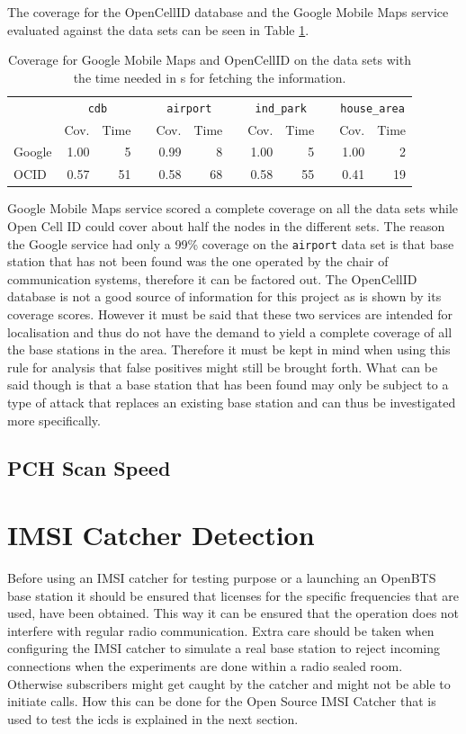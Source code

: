 The coverage for the OpenCellID database and the Google Mobile Maps service evaluated against the data sets can be seen in Table \ref{tab:coverage}.
\begin{table}
\centering
\begin{tabular}{lrrcrrcrrcrr}
\toprule
& \multicolumn{2}{c}{\texttt{cdb}} &\phantom{a}& \multicolumn{2}{c}{\texttt{airport}} &\phantom{a} & \multicolumn{2}{c}{\texttt{ind\_park}}&\phantom{a} & \multicolumn{2}{c}{\texttt{house\_area}}\\
\cmidrule{2-3} \cmidrule{5-6} \cmidrule{8-9} \cmidrule{11-12}
&Cov.&Time&	&Cov.&Time&	&Cov.&Time&	&Cov.&Time\\
\midrule
Google&		1.00&5&	&0.99&8&	&1.00&5&	&1.00&2\\
OCID&		0.57&51&	&0.58&68&	&0.58&55&	&0.41&19\\
\bottomrule
\end{tabular}
\caption{Coverage for Google Mobile Maps and OpenCellID on the data sets with the time needed in s for fetching the information.}
\label{tab:coverage}
\end{table}
Google Mobile Maps service scored a complete coverage on all the data sets while Open Cell ID could cover about half the nodes in the different sets.
The reason the Google service had only a 99\% coverage on the \texttt{airport} data set is that base station that has not been found was the one operated by the chair of communication systems, therefore it can be factored out.
The OpenCellID database is not a good source of information for this project as is shown by its coverage scores.
However it must be said that these two services are intended for localisation and thus do not have the demand to yield a complete coverage of all the base stations in the area.
Therefore it must be kept in mind when using this rule for analysis that false positives might still be brought forth.
What can be said though is that a base station that has been found may only be subject to a type of attack that replaces an existing base station and can thus be investigated more specifically.

\subsection{PCH Scan Speed}

\section{IMSI Catcher Detection}
Before using an IMSI catcher for testing purpose or a launching an OpenBTS base station it should be ensured that licenses for the specific frequencies that are used, have been obtained.
This way it can be ensured that the operation does not interfere with regular radio communication.
Extra care should be taken when configuring the IMSI catcher to simulate a real base station to reject incoming connections when the experiments are done within a radio sealed room.
Otherwise subscribers might get caught by the catcher and might not be able to initiate calls.
How this can be done for the Open Source IMSI Catcher that is used to test the \gls{icds} is explained in the next section.

